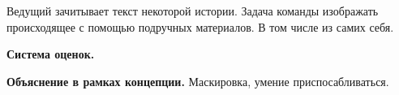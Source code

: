 
\par Ведущий зачитывает текст некоторой истории. Задача команды изображать происходящее с помощью подручных материалов. В том числе из самих себя.

\par \textbf{Система оценок.}

\par \textbf{Объяснение в рамках концепции.} Маскировка, умение приспосабливаться.